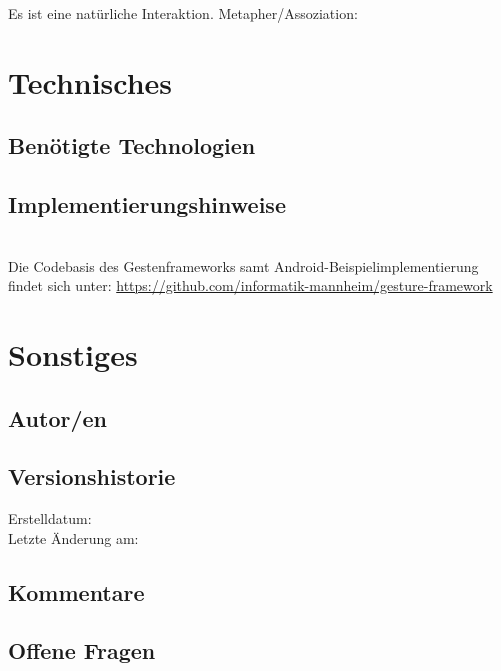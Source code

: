 \checkbox{\metaphor} Es ist eine natürliche Interaktion. Metapher/Assoziation: \metaphordesc


\ifx\requiredTechnologies\undefined	
\else
	\section*{Technisches}

	\subsection*{Benötigte Technologien}
	\requiredTechnologies

	\ifx\implementation\undefined	
	\else
		\subsection*{Implementierungshinweise}
		\implementation
	\fi
\fi

\leavevmode
\\
Die Codebasis des Gestenframeworks samt Android-Beispielimplementierung findet sich unter: \url{https://github.com/informatik-mannheim/gesture-framework}


\section*{Sonstiges}

\subsection*{Autor/en}
\authors

\subsection*{Versionshistorie}
Erstelldatum: \dateofcreation \\
Letzte Änderung am: \versionhistory


\ifx\comments\undefined	
\else
	\subsection*{Kommentare}
	\comments
\fi

\ifx\questions\undefined	
\else
	\subsection*{Offene Fragen}
	\questions
\fi

\ifx\microinteractionstabular\undefined
\else
	\ifx\requiredTechnologies\undefined
	\else
		\listoffigures
	\fi
\fi

\printbibliography

\clearpage

\printglossaries


